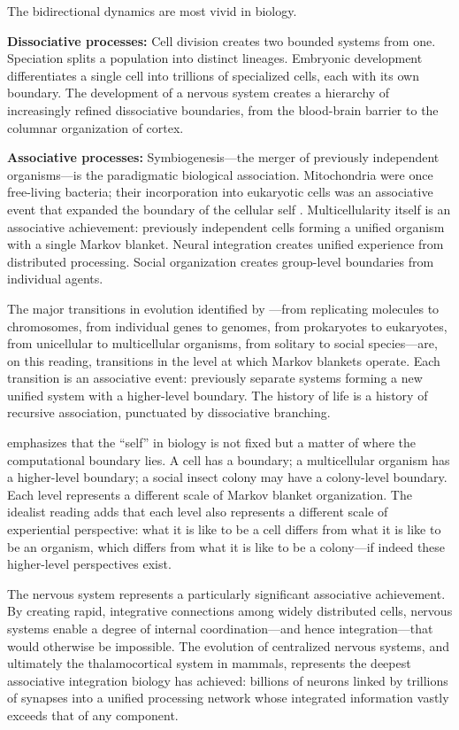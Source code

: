 \documentclass[11pt,a4paper]{article}
\theoremstyle{definition}
\theoremstyle{plain}
\theoremstyle{remark}
\begin{document}
The bidirectional dynamics are most vivid in biology.

\textbf{Dissociative processes:} Cell division creates two bounded systems from one. Speciation splits a population into distinct lineages. Embryonic development differentiates a single cell into trillions of specialized cells, each with its own boundary. The development of a nervous system creates a hierarchy of increasingly refined dissociative boundaries, from the blood-brain barrier to the columnar organization of cortex.

\textbf{Associative processes:} Symbiogenesis---the merger of previously independent organisms---is the paradigmatic biological association. Mitochondria were once free-living bacteria; their incorporation into eukaryotic cells was an associative event that expanded the boundary of the cellular self \citep{Levin2019}. Multicellularity itself is an associative achievement: previously independent cells forming a unified organism with a single Markov blanket. Neural integration creates unified experience from distributed processing. Social organization creates group-level boundaries from individual agents.

The major transitions in evolution identified by \citet{MaynardSmith1995}---from replicating molecules to chromosomes, from individual genes to genomes, from prokaryotes to eukaryotes, from unicellular to multicellular organisms, from solitary to social species---are, on this reading, transitions in the level at which Markov blankets operate. Each transition is an associative event: previously separate systems forming a new unified system with a higher-level boundary. The history of life is a history of recursive association, punctuated by dissociative branching.

\citet{Levin2019} emphasizes that the ``self'' in biology is not fixed but a matter of where the computational boundary lies. A cell has a boundary; a multicellular organism has a higher-level boundary; a social insect colony may have a colony-level boundary. Each level represents a different scale of Markov blanket organization. The idealist reading adds that each level also represents a different scale of experiential perspective: what it is like to be a cell differs from what it is like to be an organism, which differs from what it is like to be a colony---if indeed these higher-level perspectives exist.

The nervous system represents a particularly significant associative achievement. By creating rapid, integrative connections among widely distributed cells, nervous systems enable a degree of internal coordination---and hence integration---that would otherwise be impossible. The evolution of centralized nervous systems, and ultimately the thalamocortical system in mammals, represents the deepest associative integration biology has achieved: billions of neurons linked by trillions of synapses into a unified processing network whose integrated information vastly exceeds that of any component.
\end{document}
